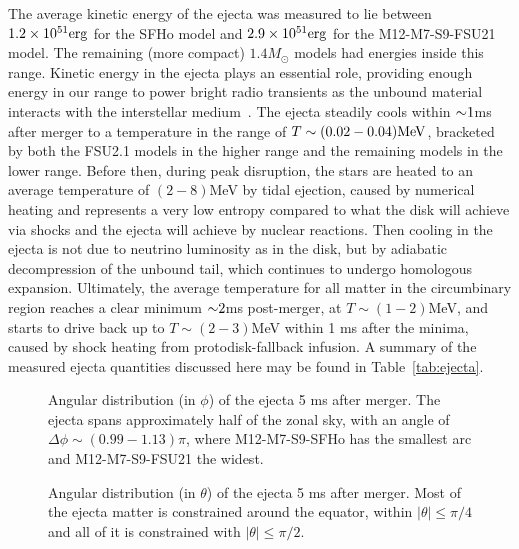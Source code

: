 The average kinetic energy of the ejecta was measured to lie between $1.2 \times 10^{51} {\rm erg} $ for the SFHo model and $2.9 \times 10^{51} {\rm erg} $ for the M12-M7-S9-FSU21 model.
The remaining (more compact) $1.4 M_\odot$ models had energies inside this range. 
Kinetic energy in the ejecta plays an essential role, providing enough energy in our range to power bright radio transients as the unbound material interacts with the interstellar medium~\cite{Nakar:2011cw}.
The ejecta steadily cools within $\mathord{\sim} 1$ms after merger to a temperature in the range of $T \sim (0.02 - 0.04) {\rm MeV}$, bracketed by both the FSU2.1 models in the higher range and the remaining models in the lower range.
Before then, during peak disruption, the stars are heated to an average temperature of $(2-8)$MeV by tidal ejection, caused by numerical heating and represents a very low entropy compared to what the disk will achieve via shocks and the ejecta will achieve by nuclear reactions.
Then cooling in the ejecta is not due to neutrino luminosity as in the disk, but by adiabatic decompression of the unbound tail, which continues to undergo homologous expansion.
Ultimately, the average temperature for all matter in the circumbinary region reaches a clear minimum $\mathord{\sim} 2$ms post-merger, at $T \sim (1-2)$MeV, and starts to drive back up to $T \sim (2-3)$MeV within 1 ms after the minima, caused by shock heating from protodisk-fallback infusion.
A summary of the measured ejecta quantities discussed here may be found in \mbox{Table \ref{tab:ejecta}}.

\begin{figure}
	\centering
	
	\caption[Angular distribution (in $\phi$) of the ejecta]{
		Angular distribution (in $\phi$) of the ejecta 5 ms after merger.  The ejecta spans approximately half of the zonal sky, with an angle of $\Delta \phi \sim (0.99-1.13) \pi$, where M12-M7-S9-SFHo has the smallest arc and M12-M7-S9-FSU21 the widest.
	}
	\label{fig:phihisto}
\end{figure}

\begin{figure}
	\centering
	
	\caption[Angular distribution (in $\theta$) of the ejecta]{
		Angular distribution (in $\theta$) of the ejecta 5 ms after merger.  
		Most of the ejecta matter is constrained around the equator, within $|\theta| \leq \pi/4$ and all of it is constrained with $|\theta| \leq \pi/2$.
	}
	\label{fig:costhetahisto}
\end{figure}


